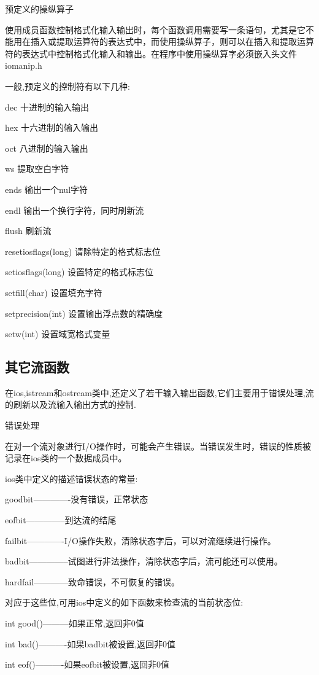 \documentclass{article}
\begin{document}
预定义的操纵算子

使用成员函数控制格式化输入输出时，每个函数调用需要写一条语句，尤其是它不能用在插入或提取运算符的表达式中，而使用操纵算子，则可以在插入和提取运算符的表达式中控制格式化输入和输出。在程序中使用操纵算字必须嵌入头文件iomanip.h

一般,预定义的控制符有以下几种:

dec 十进制的输入输出 

hex 十六进制的输入输出 

oct 八进制的输入输出 

ws 提取空白字符 

ends 输出一个nul字符 

endl 输出一个换行字符，同时刷新流 

flush 刷新流 

resetiosflags(long) 请除特定的格式标志位 

setiosflags(long) 设置特定的格式标志位 

setfill(char) 设置填充字符 

setprecision(int) 设置输出浮点数的精确度 

setw(int) 设置域宽格式变量 
\subsection{其它流函数}
\label{sec-10-4}

在ios,istream和ostream类中,还定义了若干输入输出函数,它们主要用于错误处理,流的刷新以及流输入输出方式的控制.

错误处理

在对一个流对象进行I/O操作时，可能会产生错误。当错误发生时，错误的性质被记录在ios类的一个数据成员中。

ios类中定义的描述错误状态的常量:

goodbit-------------没有错误，正常状态　

eofbit--------------到达流的结尾 

failbit-------------I/O操作失败，清除状态字后，可以对流继续进行操作。 

badbit--------------试图进行非法操作，清除状态字后，流可能还可以使用。 

hardfail------------致命错误，不可恢复的错误。 

对应于这些位,可用ios中定义的如下函数来检查流的当前状态位:

int good()---------如果正常,返回非0值

int bad()----------如果badbit被设置,返回非0值

int eof()----------如果eofbit被设置,返回非0值
\end{document}
